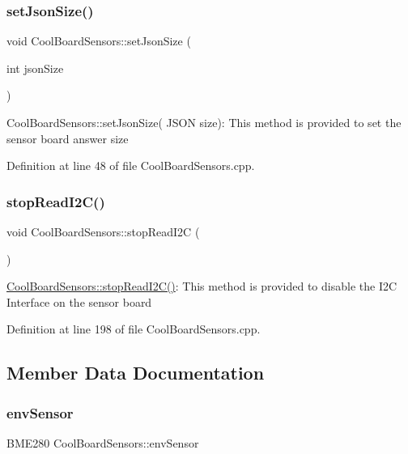 \subsubsection{\texorpdfstring{set\+Json\+Size()}{setJsonSize()}}
{\footnotesize\ttfamily void Cool\+Board\+Sensors\+::set\+Json\+Size (\begin{DoxyParamCaption}\item[{int}]{json\+Size }\end{DoxyParamCaption})}

Cool\+Board\+Sensors\+::set\+Json\+Size( J\+S\+O\+N size)\+: This method is provided to set the sensor board answer size 

Definition at line 48 of file Cool\+Board\+Sensors.\+cpp.

\mbox{\label{class_cool_board_sensors_ab67b900b9e5e7c18d52d2d9107ba171b}} 
\subsubsection{\texorpdfstring{stop\+Read\+I2\+C()}{stopReadI2C()}}
{\footnotesize\ttfamily void Cool\+Board\+Sensors\+::stop\+Read\+I2C (\begin{DoxyParamCaption}{ }\end{DoxyParamCaption})}

\hyperlink{class_cool_board_sensors_ab67b900b9e5e7c18d52d2d9107ba171b}{Cool\+Board\+Sensors\+::stop\+Read\+I2\+C()}\+: This method is provided to disable the I2C Interface on the sensor board 

Definition at line 198 of file Cool\+Board\+Sensors.\+cpp.



\subsection{Member Data Documentation}
\mbox{\label{class_cool_board_sensors_a868e38985e9a2412829fa2790ca13e2e}} 
\subsubsection{\texorpdfstring{env\+Sensor}{envSensor}}
{\footnotesize\ttfamily B\+M\+E280 Cool\+Board\+Sensors\+::env\+Sensor}



